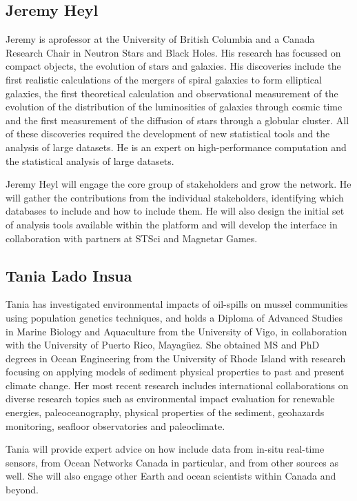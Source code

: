 \subsection*{Jeremy Heyl}
Jeremy is aprofessor at the University of British Columbia and a
Canada Research Chair in Neutron Stars and Black Holes.  His research
has focussed on compact objects, the evolution of stars and galaxies.
His discoveries include the first realistic calculations of the
mergers of spiral galaxies to form elliptical galaxies, the first
theoretical calculation and observational measurement of the evolution
of the distribution of the luminosities of galaxies through cosmic
time and the first measurement of the diffusion of stars through a
globular cluster.  All of these discoveries required the development
of new statistical tools and the analysis of large datasets. He is an
expert on high-performance computation and the statistical analysis of
large datasets.

Jeremy Heyl will engage the core group of stakeholders and grow the
network.  He will gather the contributions from the individual
stakeholders, identifying which databases to include and how to
include them.  He will also design the initial set of analysis tools
available within the platform and will develop the interface in
collaboration with partners at STSci and Magnetar Games.

\subsection*{Tania Lado Insua}

Tania has investigated environmental impacts of oil-spills on mussel
communities using population genetics techniques, and holds a Diploma
of Advanced Studies in Marine Biology and Aquaculture from the
University of Vigo, in collaboration with the University of Puerto
Rico, Mayagüez.  She obtained MS and PhD degrees in Ocean Engineering
from the University of Rhode Island with research focusing on applying
models of sediment physical properties to past and present climate
change. Her most recent research includes international collaborations
on diverse research topics such as environmental impact evaluation for
renewable energies, paleoceanography, physical properties of the
sediment, geohazards monitoring, seafloor observatories and
paleoclimate.

Tania will provide expert advice on how include data from in-situ
real-time sensors, from Ocean Networks Canada in particular, and from
other sources as well.  She will also engage other Earth and ocean
scientists within Canada and beyond.

